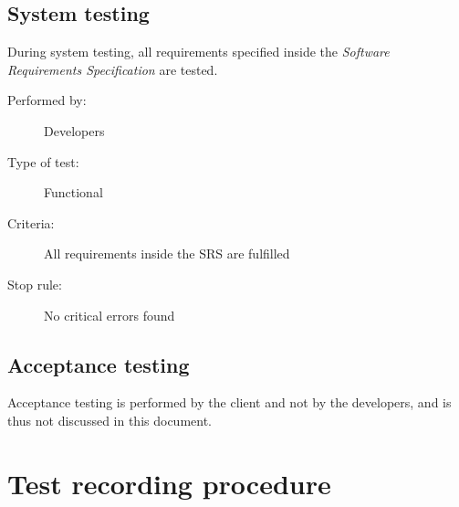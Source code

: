 \documentclass[12pt,titlepage]{article}
\begin{document}
%
%
%
%

\subsection{System testing}
\label{subsec:test-process-system-testing}

During system testing, all requirements specified inside the \textit{Software
Requirements Specification} are tested.

\begin{description}
	\item[Performed by:]	Developers
	\item[Type of test:]	Functional
	\item[Criteria:]	All requirements inside the SRS are fulfilled
	\item[Stop rule:]	No critical errors found
\end{description}

\subsection{Acceptance testing}
\label{subsec:test-process-acceptance-testing}

Acceptance testing is performed by the client and not by the developers, and is
thus not discussed in this document.




\section{Test recording procedure}
\label{sec:test-recording-procedure}
\end{document}
